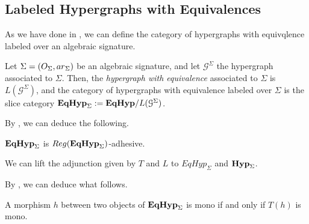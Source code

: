 \subsection{Labeled Hypergraphs with Equivalences}

As we have done in , we can define the category of hypergraphs with equivqlence labeled over an algebraic signature.

\begin{definition}
	Let $\Sigma = (O_\Sigma, \ari_\Sigma)$ be an algebraic signature, and let $\mathcal{G}^{\Sigma}$ the hypergraph associated to $\Sigma$.
	Then, the \emph{hypergraph with equivalence} associated to $\Sigma$ is $L(\mathcal{G}^\Sigma)$, and the category of hypergraphs with equivalence labeled over $\Sigma$ is the 
	slice category $\textbf{\textup{EqHyp}}_\Sigma := \textbf{\textup{EqHyp}}/L(\mathcal{G}^\Sigma)$.
\end{definition}

By , we can deduce the following.

\begin{proposition}
	$\textbf{\textup{EqHyp}}_\Sigma$ is $\reg (\EqHyp_\Sigma)$-adhesive.
\end{proposition}

We can lift the adjunction given by $T$ and $L$ to $EqHyp_\Sigma$ and $\textbf{\textup{Hyp}}_\Sigma$.

By , we can deduce what follows.

\begin{proposition}\label{prop:monos_in_eqhyps}
	A morphism $h$ between two objects of $\textbf{\textup{EqHyp}}_{\Sigma}$ is mono if and only if $T(h)$ is mono.
\end{proposition}



